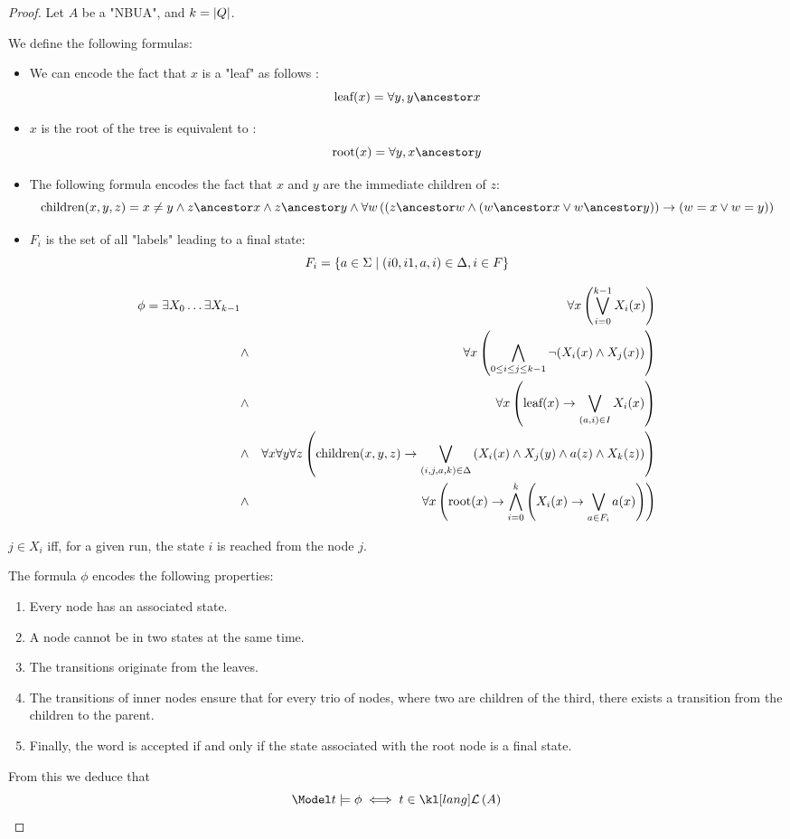 \documentclass{article}
\begin{document}
\begin{proof}
	Let $A$ be a "NBUA", and $k = \left|Q\right|$.

	We define the following formulas:
	\begin{itemize}
		\item We can encode the fact that $ x $ is a "leaf" as follows :
		      \[\text{leaf} (x) = \forall y,  y \ancestor x \]
		\item $x$ is the root of the tree is equivalent to :
		      \[\text{root} (x) = \forall y,  x \ancestor y \]
		\item The following formula encodes the fact that $ x $ and $y$ are the immediate children of $z$:
		      \[\text{children} (x,y,z) =
			      x \neq y \land
			      z  \ancestor  x \land  z \ancestor y \land
			      \forall w
			      \left( \left(
				      z \ancestor w \land
					      (w \ancestor x \lor w \ancestor  y) \right) \rightarrow (
				      w = x \lor w = y
				      )
			      \right) \]
		\item $F_i$ is the set of all "labels" leading to a final state:
		      \[F_i = \left\{a \in \Sigma \mid (i0,i1,a,i) \in \Delta, i \in F\right\}\]
	\end{itemize}

	\begin{eqnarray}
		\phi = \exists X_0 \ldots \exists X_{k-1} &\ & \forall x \left( \bigvee_{i=0}^{k-1} X_i(x) \right) \label{lem:AMSO1}\\
		&\land& \forall x \left( \bigwedge_{0 \leq i \leq j \leq k-1}  \lnot (X_i(x) \land X_j(x)) \right) \label{lem:AMSO2} \\
		&\land& \forall x  \left( \text{leaf} (x) \rightarrow \bigvee_{(a,i)\in I}  X_i(x) \right) \label{lem:AMSO3}\\
		&\land& \forall x \forall y \forall z \left(\text{children}(x,y,z) \rightarrow \bigvee_{(i,j,a,k)\in \Delta} \left(X_i(x) \land X_j(y) \land a(z) \land X_k(z)\right)\right) \label{lem:AMSO4} \\
		&\land& \forall x \left(\text{root}(x) \rightarrow \bigwedge_{i= 0}^k \left( X_i(x) \rightarrow \bigvee_{a \in F_i} a(x) \right)\right) \label{lem:AMSO5}
	\end{eqnarray}


	$j \in X_i$ iff, for a given run, the state $i$ is reached from the node $j$.

	The formula $\phi$ encodes the following properties:

	\begin{enumerate}
		\item Every node has an associated state.
		\item A node cannot be in two states at the same time.
		\item The transitions originate from the leaves.
		\item The transitions of inner nodes ensure that for every trio of nodes, where two are children of the third, there exists a transition from the children to the parent.
		\item Finally, the word is accepted if and only if the state associated with the root node is a final state.
	\end{enumerate}

	From this we deduce that
	\[ \Model t \models \phi \iff t \in \lang A \]
\end{proof}


\iffalse
	
	
\fi
\end{document}

